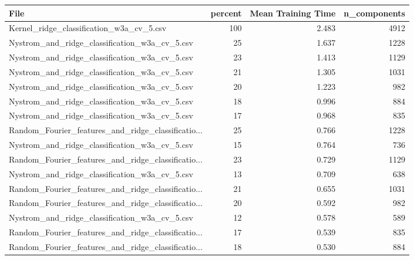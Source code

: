 \begin{tabularx}{\textwidth}{lrrr}
\toprule
                                              File &  percent &  Mean Training Time &  n\_components \\
\midrule
          Kernel\_ridge\_classification\_w3a\_cv\_5.csv &      100 &               2.483 &          4912 \\
     Nystrom\_and\_ridge\_classification\_w3a\_cv\_5.csv &       25 &               1.637 &          1228 \\
     Nystrom\_and\_ridge\_classification\_w3a\_cv\_5.csv &       23 &               1.413 &          1129 \\
     Nystrom\_and\_ridge\_classification\_w3a\_cv\_5.csv &       21 &               1.305 &          1031 \\
     Nystrom\_and\_ridge\_classification\_w3a\_cv\_5.csv &       20 &               1.223 &           982 \\
     Nystrom\_and\_ridge\_classification\_w3a\_cv\_5.csv &       18 &               0.996 &           884 \\
     Nystrom\_and\_ridge\_classification\_w3a\_cv\_5.csv &       17 &               0.968 &           835 \\
Random\_Fourier\_features\_and\_ridge\_classificatio... &       25 &               0.766 &          1228 \\
     Nystrom\_and\_ridge\_classification\_w3a\_cv\_5.csv &       15 &               0.764 &           736 \\
Random\_Fourier\_features\_and\_ridge\_classificatio... &       23 &               0.729 &          1129 \\
     Nystrom\_and\_ridge\_classification\_w3a\_cv\_5.csv &       13 &               0.709 &           638 \\
Random\_Fourier\_features\_and\_ridge\_classificatio... &       21 &               0.655 &          1031 \\
Random\_Fourier\_features\_and\_ridge\_classificatio... &       20 &               0.592 &           982 \\
     Nystrom\_and\_ridge\_classification\_w3a\_cv\_5.csv &       12 &               0.578 &           589 \\
Random\_Fourier\_features\_and\_ridge\_classificatio... &       17 &               0.539 &           835 \\
Random\_Fourier\_features\_and\_ridge\_classificatio... &       18 &               0.530 &           884 \\

\end{tabularx}
